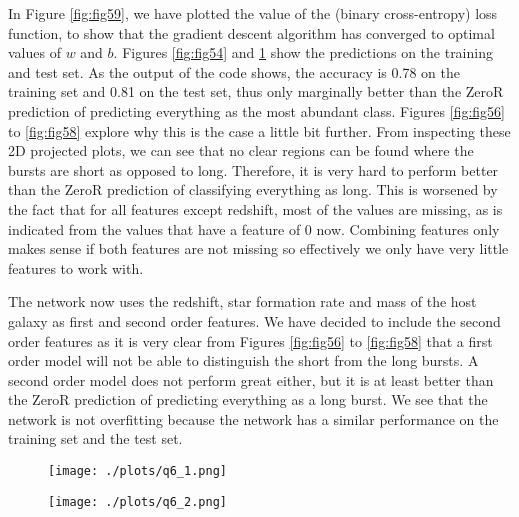 In Figure \ref{fig:fig59}, we have plotted the value of the (binary cross-entropy) loss function, to show that the gradient descent algorithm has converged to optimal values of $w$ and $b$. Figures \ref{fig:fig54} and \ref{fig:fig55} show the predictions on the training and test set. As the output of the code shows, the accuracy is 0.78 on the training set and 0.81 on the test set, thus only marginally better than the ZeroR prediction of predicting everything as the most abundant class. Figures \ref{fig:fig56} to \ref{fig:fig58} explore why this is the case a little bit further. From inspecting these 2D projected plots, we can see that no clear regions can be found where the bursts are short as opposed to long. Therefore, it is very hard to perform better than the ZeroR prediction of classifying everything as long. This is worsened by the fact that for all features except redshift, most of the values are missing, as is indicated from the values that have a feature of 0 now. Combining features only makes sense if both features are not missing so effectively we only have very little features to work with.


The network now uses the redshift, star formation rate and mass of the host galaxy as first and second order features. We have decided to include the second order features as it is very clear from Figures \ref{fig:fig56} to \ref{fig:fig58} that a first order model will not be able to distinguish the short from the long bursts. A second order model does not perform great either, but it is at least better than the ZeroR prediction of predicting everything as a long burst. We see that the network is not overfitting because the network has a similar performance on the training set and the test set. 

\begin{figure}[ht]\centering
\begin{minipage}[t]{.5\textwidth}
\centering
\texttt{[image: ./plots/q6\_1.png]}
\captionsetup{width=0.8\linewidth}
\label{fig:fig54}
\end{minipage}%
\begin{minipage}[t]{.5\textwidth}
\centering
\texttt{[image: ./plots/q6\_2.png]}
\captionsetup{width=0.8\linewidth}
\label{fig:fig55}
\end{minipage}%
\end{figure}

